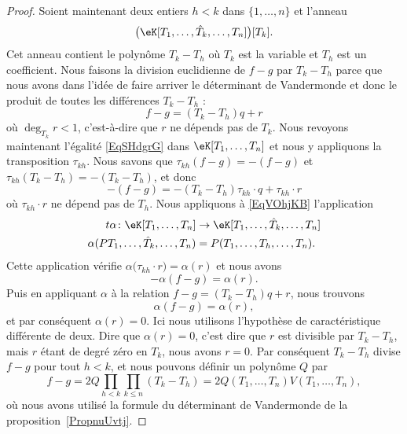 \begin{proof}
	Soient maintenant deux entiers \( h<k\) dans \( \{ 1,\ldots, n \}\) et l'anneau
	\begin{equation}
		\big( \eK[T_1,\ldots, \hat T_k,\ldots, T_n] \big)[T_k].
	\end{equation}
	Cet anneau contient le polynôme \( T_k-T_h\) où \( T_k\) est la variable et \( T_h\) est un coefficient. Nous faisons la division euclidienne de \( f-g\) par  \( T_k-T_h\) parce que nous avons dans l'idée de faire arriver le déterminant de Vandermonde et donc le produit de toutes les différences \( T_k-T_h\) :
	\begin{equation}    \label{EqSHdgrG}
		f-g=(T_k-T_h)q+r
	\end{equation}
	où \( \deg_{T_k}r<1\), c'est-à-dire que \( r\) ne dépends pas de \( T_k\). Nous revoyons maintenant l'égalité \eqref{EqSHdgrG} dans \( \eK[T_1,\ldots, T_n]\) et nous y appliquons la transposition \( \tau_{kh}\). Nous savons que \( \tau_{kh}(f-g)=-(f-g)\) et \( \tau_{kh}(T_k-T_h)=-(T_k-T_h)\), et donc
	\begin{equation}    \label{EqVOhjKB}
		-(f-g)=-(T_k-T_h)\tau_{kh}\cdot   q+\tau_{kh}\cdot r
	\end{equation}
	où \(\tau_{kh}\cdot r\) ne dépend pas de \( T_h\). Nous appliquons à \eqref{EqVOhjKB} l'application
	\begin{equation}
		\begin{aligned}
			t\alpha\colon \eK[T_1,\ldots, T_n]        & \to \eK[T_1,\ldots, \hat T_k,\ldots, T_n] \\
			\alpha(PT_1,\ldots, \hat T_k,\ldots, T_n) & =P(T_1,\ldots, T_h,\ldots, T_n).
		\end{aligned}
	\end{equation}
	Cette application vérifie \( \alpha\big( \tau_{kh}\cdot r \big)=\alpha(r)\) et nous avons
	\begin{equation}
		-\alpha(f-g)=\alpha(r).
	\end{equation}
	Puis en appliquant \( \alpha\) à la relation \( f-g=(T_k-T_h)q+r\), nous trouvons
	\begin{equation}
		\alpha(f-g)=\alpha(r),
	\end{equation}
	et par conséquent \( \alpha(r)=0\). Ici nous utilisons l'hypothèse de caractéristique différente de deux. Dire que \( \alpha(r)=0\), c'est dire que \( r\) est divisible par \( T_k-T_h\), mais \( r\) étant de degré zéro en \( T_k\), nous avons \( r=0\). Par conséquent \( T_k-T_h\) divise \( f-g\) pour tout \( h<k\), et nous pouvons définir un polynôme \( Q\) par
	\begin{equation}    \label{EqrnbgdA}
		f-g=2Q\prod_{h<k}\prod_{k\leq n}(T_k-T_h)=2Q(T_1,\ldots, T_n)V(T_1,\ldots, T_n),
	\end{equation}
	où nous avons utilisé la formule du déterminant de Vandermonde de la proposition~\ref{PropnuUvtj}.


\end{proof}

